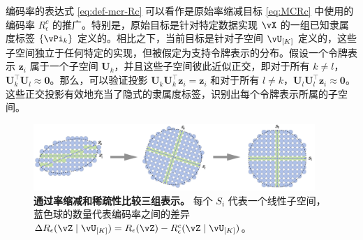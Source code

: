 \documentclass[../../book-main.tex]{subfiles}
\begin{document}
\begin{remark}
    编码率的表达式 \eqref{eq:def-mcr-Rc} 可以看作是原始率缩减目标 \eqref{eq:MCRc} 中使用的编码率 \(R_\epsilon^{c}\) 的推广。特别是，原始目标是针对特定数据实现 \(\vX\) 的一组已知隶属度标签 \(\{\vPi_{k}\}\) 定义的。相比之下，当前目标是针对子空间 \(\vU_{[K]}\) 定义的，这些子空间独立于任何特定的实现，但被假定为支持令牌表示的分布。假设一个令牌表示 $\bm z_i$ 属于一个子空间 $\bm U_k$，并且这些子空间彼此近似正交，即对于所有 $k \neq l$，$\bm U_k^\top \bm U_l \approx \bm 0$。那么，可以验证投影 $\bm U_k\bm U_k^\top \bm z_i  = \bm z_i$ 和对于所有 $l \neq k$，$\bm U_l\bm U_l^\top \bm z_i \approx \bm 0$。这些正交投影有效地充当了隐式的隶属度标签，识别出每个令牌表示所属的子空间。
\end{remark}



\begin{figure}[t!]
     \centering
         \includegraphics[width=0.95\textwidth]{figs_chap4/coding-transform.png}
     \caption{ \small\textbf{通过率缩减和稀疏性比较三组表示。} 每个 $S_i$ 代表一个线性子空间，蓝色球的数量代表编码率之间的差异 $\Delta R_{\epsilon}(\vZ \mid \vU_{[K]}) = R_\epsilon(\vZ) - R^c_\epsilon(\vZ \mid \vU_{[K]})$。
     }
        \label{fig:sparse-rate-reduction-diagram}
\end{figure}
\end{document}
